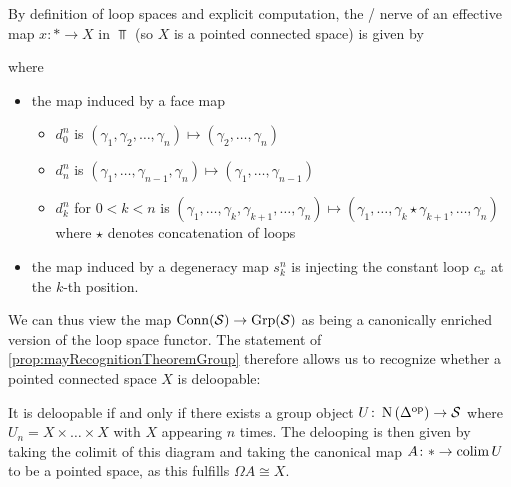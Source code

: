 \begin{remark}
    By definition of loop spaces and explicit computation, the \Cech/ nerve of an effective map $x\colon*\to X$ in $\Top$ (so $X$ is a pointed connected space) is given by
    \begin{center}
    \end{center}
    where
    \begin{itemize}
        \item the map induced by a face map 
        \begin{itemize}
            \item $d_0^n$ is $(\gamma_1,\gamma_2,\ldots,\gamma_n)\mapsto(\gamma_2,\ldots,\gamma_n)$
            \item $d_n^n$ is $(\gamma_1,\ldots,\gamma_{n-1},\gamma_n)\mapsto(\gamma_1,\ldots,\gamma_{n-1})$
            \item $d_k^n$ for $0<k<n$ is $(\gamma_1,\ldots,\gamma_k,\gamma_{k+1},\ldots,\gamma_n)\mapsto(\gamma_1,\ldots,\gamma_k\star\gamma_{k+1},\ldots,\gamma_n)$ where $\star$ denotes concatenation of loops
        \end{itemize}
        \item the map induced by a degeneracy map $s_k^n$ is injecting the constant loop $c_x$ at the $k$-th position.
    \end{itemize}
    We can thus view the map $\operatorname{Conn}(\mathcal{S})\to\operatorname{Grp}(\mathcal{S})$ as being a canonically enriched version of the loop space functor.
    The statement of \cref{prop:mayRecognitionTheoremGroup} therefore allows us to recognize whether a pointed connected space $X$ is deloopable:

    It is deloopable if and only if there exists a group object $U\colon\operatorname{N}\left(\Delta^{\operatorname{op}}\right)\to\mathcal{S}$ where $U_n= X\times\ldots\times X$ with $X$ appearing $n$ times. %
    The delooping is then given by taking the colimit of this diagram and taking the canonical map $A\colon*\to\operatorname{colim} U$ to be a pointed space, as this fulfills $\Omega A\cong X$.
\end{remark}


